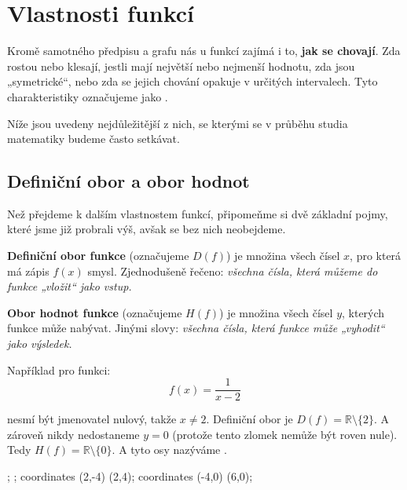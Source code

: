 \documentclass[12pt,a4paper]{article}
\begin{document}
\newpage
\section{Vlastnosti funkcí}

Kromě samotného předpisu a grafu nás u funkcí zajímá i to, \textbf{jak se chovají}.  
Zda rostou nebo klesají, jestli mají největší nebo nejmenší hodnotu, zda jsou „symetrické“, nebo zda se jejich chování opakuje v určitých intervalech.  
Tyto charakteristiky označujeme jako .  

Níže jsou uvedeny nejdůležitější z nich, se kterými se v průběhu studia matematiky budeme často setkávat.



\subsection*{Definiční obor a obor hodnot}

Než přejdeme k dalším vlastnostem funkcí, připomeňme si dvě základní pojmy,
které jsme již probrali výš, avšak se bez nich neobejdeme.

\begin{definitionbox}
\textbf{Definiční obor funkce} (označujeme \(D(f)\)) je množina všech čísel \(x\), pro která má zápis \(f(x)\) smysl.  
Zjednodušeně řečeno: \textit{všechna čísla, která můžeme do funkce „vložit“ jako vstup.}
\end{definitionbox}

\begin{definitionbox}
\textbf{Obor hodnot funkce} (označujeme \(H(f)\)) je množina všech čísel \(y\), kterých funkce může nabývat.  
Jinými slovy: \textit{všechna čísla, která funkce může „vyhodit“ jako výsledek.}
\end{definitionbox}

\begin{examplebox}
Například pro funkci:
\[
f(x) = \frac{1}{x - 2}
\]

nesmí být jmenovatel nulový, takže \(x \neq 2\).  
Definiční obor je \(D(f) = \mathbb{R} \setminus \{2\}\).
A zároveň nikdy nedostaneme \(y = 0\) (protože tento zlomek nemůže být roven nule).  
Tedy \(H(f) = \mathbb{R} \setminus \{0\}\). A tyto osy nazýváme .
\end{examplebox}

\begin{center}
  \begin{axisgraph}[grid=none, xmin=-4, xmax=6, ymin=-4, ymax=4, title={Graf funkce: \(f(x) = \dfrac{1}{x-2}\)}]
      ;
      ;
       coordinates {(2,-4) (2,4)};
       coordinates {(-4,0) (6,0)};
  \end{axisgraph}
\end{center}
\end{document}
